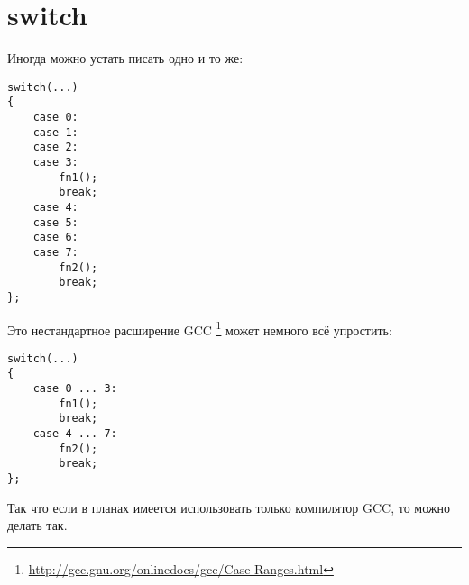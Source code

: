 ﻿\section{switch}

Иногда можно устать писать одно и то же:

\begin{lstlisting}
switch(...)
{
	case 0:
	case 1:
	case 2:
	case 3:
		fn1();
		break;
	case 4:
	case 5:
	case 6:
	case 7:
		fn2();
		break;
};
\end{lstlisting}

Это нестандартное расширение GCC
\footnote{\url{http://gcc.gnu.org/onlinedocs/gcc/Case-Ranges.html}} может немного всё упростить:

\begin{lstlisting}
switch(...)
{
	case 0 ... 3:
		fn1();
		break;
	case 4 ... 7:
		fn2();
		break;
};
\end{lstlisting}

Так что если в планах имеется использовать только компилятор GCC, то можно делать так.


